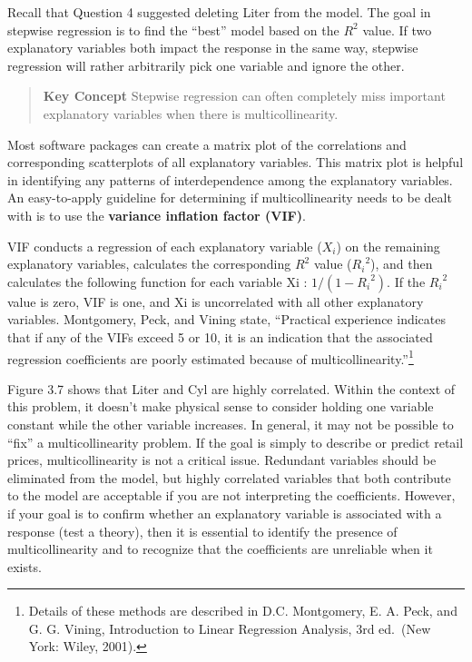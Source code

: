 \documentclass[
]{report}
\begin{document}
Recall that Question 4 suggested deleting Liter from the model. The goal in stepwise regression is to find the ``best'' model based on the \(R^2\) value. If two explanatory variables both impact the response in the same way, stepwise regression will rather arbitrarily pick one variable and ignore the other.

\begin{quote}
\textbf{Key Concept}
Stepwise regression can often completely miss important explanatory variables when there is multicollinearity.
\end{quote}

Most software packages can create a matrix plot of the correlations and corresponding scatterplots of all explanatory variables. This matrix plot is helpful in identifying any patterns of interdependence among the explanatory variables. An easy-to-apply guideline for determining if multicollinearity needs to be dealt with is to use the \textbf{variance inflation factor (VIF)}.

VIF conducts a regression of each explanatory variable (\(X_i\)) on the remaining explanatory variables, calculates the corresponding \(R^2\) value (\({R_i}^2\)), and then calculates the following function for each variable Xi : \(1/(1 - {R_i}^2)\). If the \({R_i}^2\) value is zero, VIF is one, and Xi is uncorrelated with all other explanatory variables. Montgomery, Peck, and Vining state, ``Practical experience indicates that if any of the VIFs exceed 5 or 10, it is an indication that the associated regression coefficients are poorly estimated because of multicollinearity.''\footnote{Details of these methods are described in D.C. Montgomery, E. A. Peck, and G. G. Vining, Introduction to Linear Regression Analysis, 3rd ed.~(New York: Wiley, 2001).}

Figure 3.7 shows that Liter and Cyl are highly correlated. Within the context of this problem, it doesn't make physical sense to consider holding one variable constant while the other variable increases. In general, it may not be possible to ``fix'' a multicollinearity problem. If the goal is simply to describe or predict retail prices, multicollinearity is not a critical issue. Redundant variables should be eliminated from the model, but highly correlated variables that both contribute to the model are acceptable if you are not interpreting the coefficients. However, if your goal is to confirm whether an explanatory variable is associated with a response (test a theory), then it is essential to identify the presence of multicollinearity and to recognize that the coefficients are unreliable when it exists.
\end{document}
